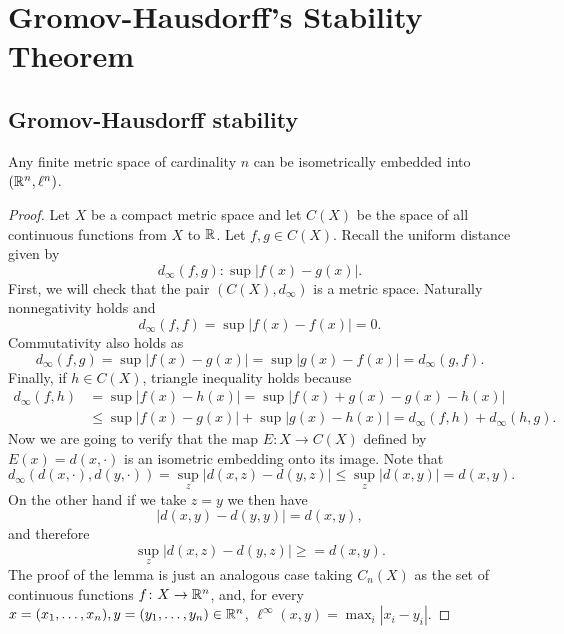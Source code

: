 \chapter{Gromov-Hausdorff's Stability Theorem}
\section{Gromov-Hausdorff stability}

\begin{lemma} \label{lemma:haus-aux-1}
    Any finite metric space of cardinality $ n $ can be isometrically embedded into $(\mathbb R^n, \ell^n)$.
\end{lemma}
\begin{proof}
    Let $ X $ be a compact metric space and let $ C(X) $ be the space of all continuous functions from $ X $ to $ \mathbb R $. Let $ f, g \in C(X) $. Recall the uniform distance given by
    \begin{equation}
        d_\infty(f, g) \colon \sup | f(x) - g(x) |.
    \end{equation}
    First, we will check that the pair $ (C(X), d_\infty) $ is a metric space. Naturally nonnegativity holds and 
    \begin{equation}
        d_\infty(f, f) = \sup | f(x) - f(x) | = 0.
    \end{equation}
    Commutativity also holds as 
    \begin{equation}
        d_\infty(f, g) = \sup | f(x) - g(x) | = \sup | g(x) - f(x) | = d_\infty(g, f).
    \end{equation}
    Finally, if $ h \in C(X) $, triangle inequality holds because
    \begin{align}
        d_\infty(f, h) &= \sup | f(x) - h(x) | = \sup | f(x) + g(x) - g(x) - h(x) | \\
        &\leq \sup | f(x)- g(x) | + \sup | g(x) - h(x) | = d_\infty(f, h) + d_\infty(h, g).
    \end{align}
    Now we are going to verify that the map $ E \colon X \to C(X) $ defined by $ E(x) = d(x, \cdot) $ is an isometric embedding onto its image. Note that
    \begin{equation}
        d_\infty(d(x, \cdot), d(y, \cdot)) = \sup_z |d(x, z) - d(y, z)| \leq  \sup_z |d(x, y)| = d(x, y).
    \end{equation}
    On the other hand if we take $ z = y $ we then have
    \begin{equation}
        |d(x, y) - d(y, y)| = d(x, y),
    \end{equation}
    and therefore
    \begin{equation}
        \sup_z |d(x, z) - d(y, z)| \geq = d(x, y).
    \end{equation}
    The proof of the lemma is just an analogous case taking $ C_n(X) $ as the set of continuous functions $ f \colon X \to \mathbb R^n $, and, for every $ x = (x_1, \dots, x_n), y = (y_1, \dots, y_n) \in \mathbb R^n $, $ \ell^\infty(x, y) = \max_i |x_i - y_i|$.
\end{proof}

